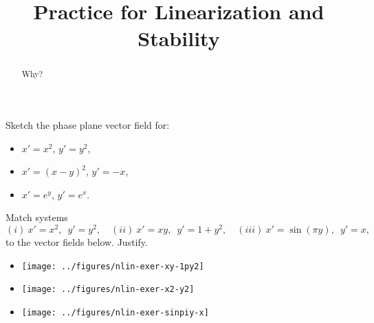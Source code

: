 \documentclass{ximera}
\title{Practice for Linearization and Stability}
\begin{document}
\begin{abstract}
Why?
\end{abstract}
\maketitle


\begin{exercise}
    Sketch the phase plane vector field for:
    \begin{itemize}
        \item $x'=x^2$, \enspace $y'=y^2$,
        \item $x'=(x-y)^2$, \enspace $y'=-x$,
        \item $x'=e^y$, \enspace $y'=e^x$.
    \end{itemize}
\end{exercise}

\begin{exercise}
    Match systems
    \begin{equation*}
        (i)\  x'=x^2, \enspace y'=y^2, \quad (ii)\  x'=xy, \enspace y'=1+y^2, \quad (iii)\  x'=\sin(\pi y), \enspace y'=x,
    \end{equation*}
    to the vector fields below.  Justify.
    \begin{itemize}
        \item \parbox[c]{1.75in}{\texttt{[image: ../figures/nlin-exer-xy-1py2]}}
            \begin{multipleChoice}
            \end{multipleChoice}
        \item \parbox[c]{1.75in}{\texttt{[image: ../figures/nlin-exer-x2-y2]}}
            \begin{multipleChoice}
            \end{multipleChoice}
        \item \parbox[c]{1.75in}{\texttt{[image: ../figures/nlin-exer-sinpiy-x]}}
            \begin{multipleChoice}
            \end{multipleChoice}
    \end{itemize}
\end{exercise}
\end{document}
